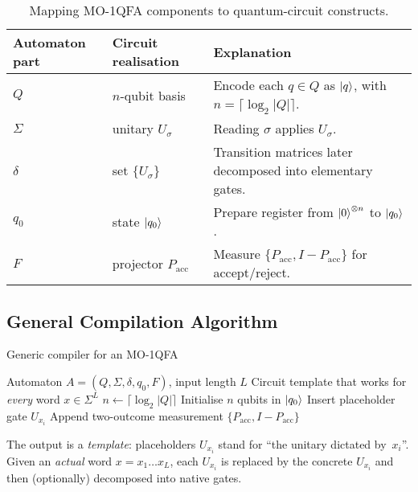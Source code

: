 \vspace{6pt}
\begin{table}[ht]
\centering
\footnotesize
\begin{tabularx}{\textwidth}{>{\raggedright\arraybackslash}p{}%
                        >{\raggedright\arraybackslash}p{}X}
\toprule
\textbf{Automaton part} & \textbf{Circuit realisation} & \textbf{Explanation}\\
\midrule
$Q$          & $n$-qubit basis        & Encode each $q\in Q$ as $\ket{q}$, with $n=\lceil\log_2|Q|\rceil$.\\
$\Sigma$     & unitary $U_\sigma$     & Reading $\sigma$ applies $U_\sigma$.\\
$\delta$     & set $\{U_\sigma\}$     & Transition matrices later decomposed into elementary gates.\\
$q_0$        & state $\ket{q_0}$      & Prepare register from $\ket{0}^{\otimes n}$ to $\ket{q_0}$.\\
$F$          & projector $P_{\text{acc}}$ & Measure $\{P_{\text{acc}},I-P_{\text{acc}}\}$ for accept/reject.\\
\bottomrule
\end{tabularx}
\caption{Mapping MO-1QFA components to quantum-circuit constructs.}
\label{tab:moqfa-mapping-new}
\end{table}

\subsection{General Compilation Algorithm}

\begin{algorithm}[H]
\caption{Generic compiler for an MO-1QFA}
\label{alg:mo-compiler}
\begin{algorithmic}[1]
\Require Automaton $A=(Q,\Sigma,\delta,q_0,F)$,\; input length $L$
\Ensure Circuit template that works for \emph{every} word $x\in\Sigma^L$
\State $n\gets\lceil\log_2|Q|\rceil$
\State Initialise $n$ qubits in $\ket{q_0}$
   \State Insert placeholder gate $\boxed{U_{x_i}}$
\EndFor
\State Append two-outcome measurement $\{P_{\text{acc}},I-P_{\text{acc}}\}$
\end{algorithmic}
\end{algorithm}

The output is a \emph{template}: placeholders $\boxed{U_{x_i}}$
stand for “the unitary dictated by~$x_i$”.
Given an \emph{actual} word
$x=x_1\!\dots x_L$,  
each $\boxed{U_{x_i}}$ is replaced by the concrete $U_{x_i}$
and then (optionally) decomposed into native gates.

